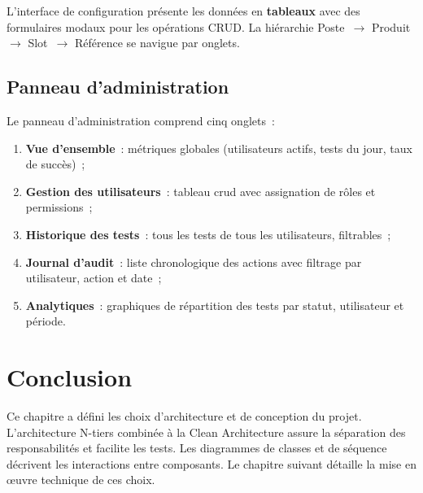L'interface de configuration présente les données en \textbf{tableaux}
avec des formulaires modaux pour les opérations CRUD. La hiérarchie
Poste~$\to$ Produit~$\to$ Slot~$\to$ Référence se navigue par onglets.


\subsection{Panneau d'administration}

Le panneau d'administration comprend cinq onglets~:
\begin{enumerate}
  \item \textbf{Vue d'ensemble}~: métriques globales (utilisateurs actifs,
        tests du jour, taux de succès)~;
  \item \textbf{Gestion des utilisateurs}~: tableau \gls{crud} avec
        assignation de rôles et permissions~;
  \item \textbf{Historique des tests}~: tous les tests de tous les
        utilisateurs, filtrables~;
  \item \textbf{Journal d'audit}~: liste chronologique des actions avec
        filtrage par utilisateur, action et date~;
  \item \textbf{Analytiques}~: graphiques de répartition des tests par
        statut, utilisateur et période.
\end{enumerate}


\section*{Conclusion}

Ce chapitre a défini les choix d'architecture et de conception du projet.
L'architecture N-tiers combinée à la Clean Architecture assure la
séparation des responsabilités et facilite les tests. Les diagrammes de
classes et de séquence décrivent les interactions entre composants. Le
chapitre suivant détaille la mise en œuvre technique de ces choix.
